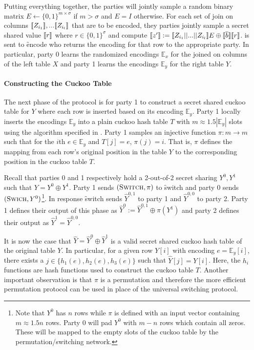 
Putting everything together, the parties will jointly sample a random binary matrix $E\gets\{0,1\}^{m\times \sigma}$ if $m>\sigma$ and $E=I$ otherwise. For each set of join on columns $\llbracket Z_{i_1}\rrbracket,...\llbracket Z_{i_l}\rrbracket$ that are to be encoded, they parties jointly sample a secret shared value $\llbracket r\rrbracket$ where $r\in\{0,1\}^\sigma$ and compute $\llbracket z'\rrbracket:=\llbracket Z_{i_1}||...||Z_{i_l}\rrbracket E \oplus \llbracket \overline{b}\rrbracket\llbracket r\rrbracket$.  is sent to \f{encode} who returns the encoding for that row to the appropriate party. In particular, party 0 learns the randomized encodings $\mathbb{E}_x$ for the joined on columns of the left table $X$ and party 1 learns the encodings $\mathbb{E}_y$ for the right table $Y$.

\paragraph{Constructing the Cuckoo Table}

The next phase of the protocol is for party 1 to construct a secret shared cuckoo table for $Y$ where each row is inserted based on its encoding $\mathbb{E}_y$. Party 1 locally inserts the encodings $\mathbb{E}_y$ into a plain cuckoo hash table $T$ with $m\approx 1.5|\mathbb{E}_y|$ slots using the algorithm specified in . Party 1 samples an injective function $\pi : m\rightarrow m$ such that for the $i$th $e\in \mathbb{E}_y$ and $T[j]=e$, $\pi(j)=i$. That is, $\pi$ defines the mapping from each row's original position in the table $Y$ to the corresponding position in the cuckoo table $T$.

Recall that parties 0 and 1 respectively hold a 2-out-of-2 secret sharing $Y^0,Y^1$ such that $Y=Y^0\oplus Y^1$. 
Party 1 sends $(\textsc{Switch}, \pi)$ to \f{switch} and party 0 sends $(\textsc{Swich}, Y^0)$\footnote{Note that $Y^0$ has $n$ rows while $\pi$ is defined with an input vector containing $m\approx 1.5n$ rows. Party 0 will pad $Y^0$ with $m-n$ rows which contain all zeros. These will be mapped to the empty slots of the cuckoo table by the permutation/switching network.}. In response \f{switch} sends $\hat Y^{0,1}$ to party 1  and $\hat Y^{0,0}$ to party 2. Party 1 defines their output of this phase as $\hat Y^0:=\hat Y^{0,1} \oplus \pi(Y^1)$ and party 2 defines their output as $\hat Y^{1} =\hat Y^{0,0}$.

It is now the case that $\hat Y = \hat Y^0\oplus \hat Y^1$ is a valid secret shared cuckoo hash table of the original table $Y$. In particular, for a given row $Y[i]$ with encoding $e=\mathbb{E}_y[i]$, there exists a $j\in \{h_1(e),h_2(e), h_3(e)\}$ such that  $\hat Y[j] = Y[i]$. Here, the $h_i$ functions are hash functions used to construct the cuckoo table $T$. Another important observation is that $\pi$ is a permutation and therefore the more efficient permutation protocol can be used in place of the universal switching protocol.

